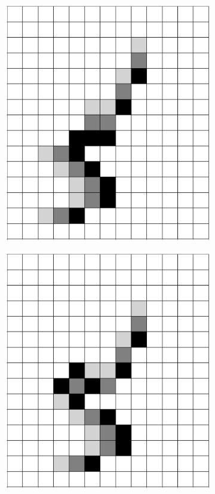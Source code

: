 \documentclass[12pt]{article}
\numberwithin{figure}{section} %
\begin{document}
\begin{figure}[H]
\begin{subfigure}{0.24\textwidth}
     		\includegraphics[width=\linewidth]{Section4/36.1}
     		\subcaption{}
   	\end{subfigure}
	\begin{subfigure}{0.24\textwidth}
     		\includegraphics[width=\linewidth]{Section4/36.2}

\end{subfigure}
\end{figure}
\end{document}
